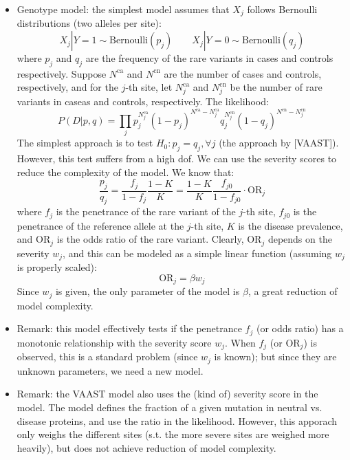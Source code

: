\documentclass[11pt]{article}
\begin{document}
\begin{enumerate}
\begin{itemize}
\item Genotype model: the simplest model assumes that $X_j$ follows Bernoulli distributions (two alleles per site): 
\begin{equation}
X_j | Y = 1 \sim \text{Bernoulli}(p_j)	\qquad X_j | Y = 0 \sim \text{Bernoulli}(q_j)
\end{equation}
where $p_j$ and $q_j$ are the frequency of the rare variants in cases and controls respectively. Suppose $N^{\text{ca}}$ and $N^{\text{cn}}$ are the number of cases and controls, respectively, and for the $j$-th site, let $N^{\text{ca}}_j$ and $N^{\text{cn}}_j$ be the number of rare variants in caseas and controls, respectively. The likelihood: 
\begin{equation}
P(D|p,q) = \prod_j p_j^{N^{\text{ca}}_j} (1 - p_j)^{N^{\text{ca}} - N^{\text{ca}}_j} 	q_j^{N^{\text{cn}}_j} (1 - q_j)^{N^{\text{cn}} - N^{\text{cn}}_j} 
\end{equation}
The simplest approach is to test $H_0: p_j = q_j, \forall j$ (the approach by [VAAST]). However, this test suffers from a high dof. We can use the severity scores to reduce the complexity of the model. We know that: 
\begin{equation}
\frac{p_j}{q_j} = \frac{f_j}{1 - f_j} \frac{1 - K}{K}	= \frac{1 - K}{K} \frac{f_{j0}}{1 - f_{j0}} \cdot \text{OR}_j
\end{equation}
where $f_j$ is the penetrance of the rare variant of the $j$-th site, $f_{j0}$ is the penetrance of the reference allele at the $j$-th site, $K$ is the disease prevalence, and $\text{OR}_j$ is the odds ratio of the rare variant. Clearly, $\text{OR}_j$ depends on the severity $w_j$, and this can be modeled as a simple linear function (assuming $w_j$ is properly scaled):
\begin{equation}
\text{OR}_j = \beta w_j	
\end{equation}
Since $w_j$ is given, the only parameter of the model is $\beta$, a great reduction of model complexity. 

\item Remark: this model effectively tests if the penetrance $f_j$ (or odds ratio) has a monotonic relationship with the severity score $w_j$. When $f_j$ (or $\text{OR}_j$) is observed, this is a standard problem (since $w_j$ is known); but since they are unknown parameters, we need a new model. 

\item Remark: the VAAST model also uses the (kind of) severity score in the model. The model defines the fraction of a given mutation in neutral vs. disease proteins, and use the ratio in the likelihood. However, this apporach only weighs the different sites (s.t. the more severe sites are weighed more heavily), but does not achieve reduction of model complexity. 
\end{itemize}

\end{enumerate}
\pagebreak
\end{document}
